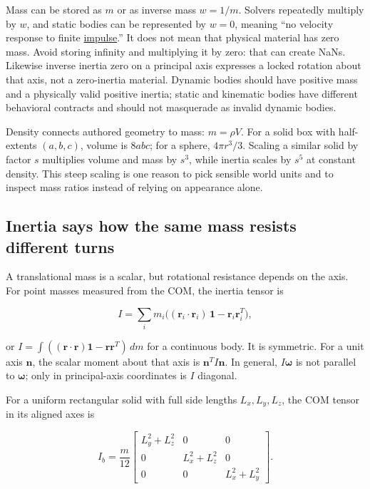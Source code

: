 Mass can be stored as \(m\) or as inverse mass \(w=1/m\). Solvers repeatedly multiply by \(w\), and static bodies can be represented by \(w=0\), meaning ``no velocity response to finite \hyperref[appendix-c39931e6e4c2]{impulse}.'' It does not mean that physical material has zero mass. Avoid storing infinity and multiplying it by zero: that can create NaNs. Likewise inverse inertia zero on a principal axis expresses a locked rotation about that axis, not a zero-inertia material. Dynamic bodies should have positive mass and a physically valid positive inertia; static and kinematic bodies have different behavioral contracts and should not masquerade as invalid dynamic bodies.

Density connects authored geometry to mass: \(m=\rho V\). For a solid box with half-extents \((a,b,c)\), volume is \(8abc\); for a sphere, \(4\pi r^3/3\). Scaling a similar solid by factor \(s\) multiplies volume and mass by \(s^3\), while inertia scales by \(s^5\) at constant density. This steep scaling is one reason to pick sensible world units and to inspect mass ratios instead of relying on appearance alone.

\subsection{Inertia says how the same mass resists different turns}\label{06-engine-ii-ch034-inertia-says-how-the-same-mass-resists-different-turns}

A translational mass is a scalar, but rotational resistance depends on the axis. For point masses measured from the COM, the inertia tensor is

\[
I=\sum_i m_i\big((\mathbf r_i\cdot\mathbf r_i)\,\mathbf 1-\mathbf r_i\mathbf r_i^T\big),
\]

or \(I=\int((\mathbf r\cdot\mathbf r)\mathbf 1-\mathbf r\mathbf r^T)\,dm\) for a continuous body. It is symmetric. For a unit axis \(\mathbf n\), the scalar moment about that axis is \(\mathbf n^T I\mathbf n\). In general, \(I\boldsymbol\omega\) is not parallel to \(\boldsymbol\omega\); only in principal-axis coordinates is \(I\) diagonal.

For a uniform rectangular solid with full side lengths \(L_x,L_y,L_z\), the COM tensor in its aligned axes is

\[
I_b=\frac{m}{12}\begin{bmatrix}L_y^2+L_z^2&0&0\\0&L_x^2+L_z^2&0\\0&0&L_x^2+L_y^2\end{bmatrix}.
\]

